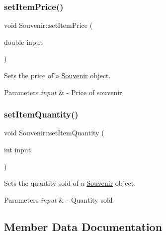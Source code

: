 \subsubsection{\texorpdfstring{set\+Item\+Price()}{setItemPrice()}}
{\footnotesize\ttfamily void Souvenir\+::set\+Item\+Price (\begin{DoxyParamCaption}\item[{double}]{input }\end{DoxyParamCaption})\hspace{0.3cm}{\ttfamily [inline]}}



Sets the price of a \hyperlink{class_souvenir}{Souvenir} object. 


\begin{DoxyParams}{Parameters}
{\em input} & -\/ Price of souvenir \\
\hline
\end{DoxyParams}
\mbox{\label{class_souvenir_a058a2d7d29ff07c14753f33f2a344b9a}} 
\subsubsection{\texorpdfstring{set\+Item\+Quantity()}{setItemQuantity()}}
{\footnotesize\ttfamily void Souvenir\+::set\+Item\+Quantity (\begin{DoxyParamCaption}\item[{int}]{input }\end{DoxyParamCaption})\hspace{0.3cm}{\ttfamily [inline]}}



Sets the quantity sold of a \hyperlink{class_souvenir}{Souvenir} object. 


\begin{DoxyParams}{Parameters}
{\em input} & -\/ Quantity sold \\
\hline
\end{DoxyParams}


\subsection{Member Data Documentation}
\mbox{\label{class_souvenir_a2b4d7fa7359c623bad007f875de71131}} 

